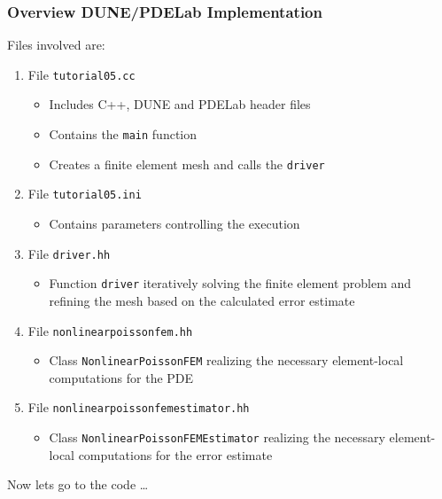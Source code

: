 \documentclass[ignorenonframetext,11pt]{beamer}
\theoremstyle{definition}
\begin{document}
\begin{frame}
\frametitle{Overview DUNE/PDELab Implementation}
Files involved are:
\begin{enumerate}[1)]
\item File \lstinline{tutorial05.cc} 
\begin{itemize}
\item Includes C++, DUNE and PDELab header files 
\item Contains the \lstinline{main} function
\item Creates a finite element mesh and calls the \lstinline{driver}
\end{itemize}
\item File \lstinline{tutorial05.ini} 
\begin{itemize}
\item Contains parameters controlling the execution
\end{itemize}
\item File \lstinline{driver.hh}
\begin{itemize}
\item Function \lstinline{driver} iteratively solving the finite element problem
  and refining the mesh based on the calculated error estimate
\end{itemize}
\item File \lstinline{nonlinearpoissonfem.hh} 
\begin{itemize}
\item Class \lstinline{NonlinearPoissonFEM} 
realizing the necessary element-local computations for the PDE
\end{itemize}
\item File \lstinline{nonlinearpoissonfemestimator.hh} 
\begin{itemize}
\item Class \lstinline{NonlinearPoissonFEMEstimator} 
realizing the necessary element-local computations for the error estimate
\end{itemize}
\end{enumerate}
Now lets go to the code \ldots
\end{frame}
\end{document}
